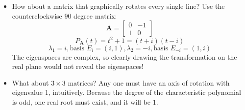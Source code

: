 \documentclass[10pt, oneside]{article}
\newcommand{\mat}[1]{\mathbf{#1}}
\begin{document}
\begin{itemize}
    \item How about a matrix that graphically rotates every single line? Use the counterclockwise $90$ degree matrix:
        \[\mat{A} = \begin{bmatrix}
            0 & -1\\
            1 & 0
            \end{bmatrix}\]
        \[P_\mat{A}(t) = t^2 + 1 = (t+i)(t-i)\]
        \[\lambda_1 = i, \text{basis } E_i = (i,1), \lambda_2 = -i, \text{basis } E_{-i} = (1,i)\]
        The eigenspaces are complex, so clearly drawing the transformation on the real plane would not reveal the eigenspaces!
    \item What about $3\times3$ matrices? Any one must have an axis of rotation with eigenvalue 1, intuitively. Because the degree of the characteristic polynomial is odd, one real root must exist, and it will be $1$.
\end{itemize}
\end{document}
